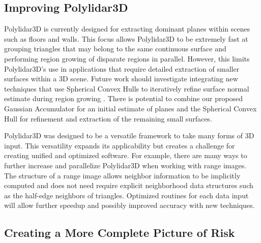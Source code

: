 \subsection{Improving Polylidar3D}

Polylidar3D is currently designed for extracting dominant planes within scenes such as floors and walls. This focus allows Polylidar3D to be extremely fast at grouping triangles that may belong to the same continuous surface and performing region growing of disparate regions in parallel. However, this limits Polylidar3D's use in applications that require detailed extraction of smaller surfaces within a 3D scene. Future work should investigate integrating new techniques that use Spherical Convex Hulls to iteratively refine surface normal estimate during region growing \cite{mols_highly_2020}. There is potential to combine our proposed Gaussian Accumulator for an initial estimate of planes and the Spherical Convex Hull for refinement and extraction of the remaining small surfaces. 

Polylidar3D was designed to be a versatile framework to take many forms of 3D input.  This versatility expands its applicability but creates a challenge for creating unified and optimized software. For example, there are many ways to further increase and parallelize Polylidar3D when working with range images. The structure of a range image allows neighbor information to be implicitly computed and does not need require explicit neighborhood data structures such as the half-edge neighbors of triangles. Optimized routines for each data input will allow further speedup and possibly improved accuracy with new techniques.


\subsection{Creating a More Complete Picture of Risk}

